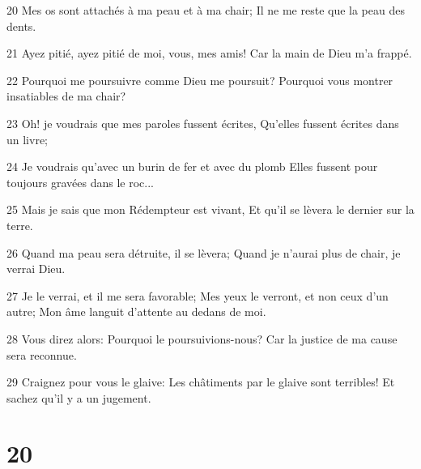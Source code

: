 \par 20 Mes os sont attachés à ma peau et à ma chair; Il ne me reste que la peau des dents.
\par 21 Ayez pitié, ayez pitié de moi, vous, mes amis! Car la main de Dieu m'a frappé.
\par 22 Pourquoi me poursuivre comme Dieu me poursuit? Pourquoi vous montrer insatiables de ma chair?
\par 23 Oh! je voudrais que mes paroles fussent écrites, Qu'elles fussent écrites dans un livre;
\par 24 Je voudrais qu'avec un burin de fer et avec du plomb Elles fussent pour toujours gravées dans le roc...
\par 25 Mais je sais que mon Rédempteur est vivant, Et qu'il se lèvera le dernier sur la terre.
\par 26 Quand ma peau sera détruite, il se lèvera; Quand je n'aurai plus de chair, je verrai Dieu.
\par 27 Je le verrai, et il me sera favorable; Mes yeux le verront, et non ceux d'un autre; Mon âme languit d'attente au dedans de moi.
\par 28 Vous direz alors: Pourquoi le poursuivions-nous? Car la justice de ma cause sera reconnue.
\par 29 Craignez pour vous le glaive: Les châtiments par le glaive sont terribles! Et sachez qu'il y a un jugement.

\chapter{20}

